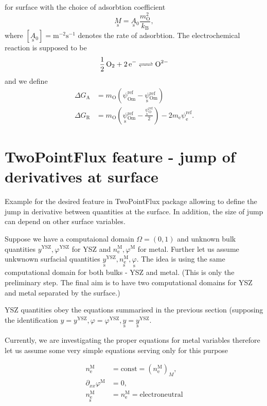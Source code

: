 \documentclass{article}
\numberwithin{equation}{section}
\newcommand{\us}[1]{\underset{\textrm{s}}{#1}{}}
\def\kB{k_\mathrm{B}}
\def\Ox{\mathrm{O}}
\def\DGA{\Delta G_\textrm{A}  }
\def\DGR{\Delta G_\textrm{R}  }
\def \YSZ{\textrm{YSZ}}
\def \M{\textrm{M}}
\def \yY{y^\YSZ}
\def \varphiY{\varphi^\YSZ}
\def \neM{n_\textrm{e}^\M}
\def \varphiM{\varphi^\M}
\def \yYs{{\us y}^\YSZ}
\def \neMs{\us \neM}
\begin{document}
for surface with the choice of adsorbtion coefficient
$$
\us M = \us A_0  \frac{m_\Ox^2}{\kB},
$$
where $[\us A_0] = \textrm{m}^{-2} \textrm{s}^{-1}$ denotes the rate of adsorbtion. The electrochemical reaction is supposed to be
\begin{align}
\ce{\frac{1}{2} \Ox_2 + 2\textrm{e}^- <=> \Ox^{2-}}
\end{align}
and we define
\begin{subequations}
\begin{align}
\DGA
&=
m_\Ox
\left(
	\psi_{\textrm{Om}}^\textrm{ref}
	-
	\us \psi_{\textrm{Om}}^\textrm{ref}
\right)
\\
\DGR
&= 
m_\Ox
\left(
	\us \psi_{\textrm{Om}}^\textrm{ref}
	-
	\frac{\us \psi_{\Ox}^\textrm{ref}}{2}
\right)
-
2 m_\textrm{e} \psi_{\textrm{e}}^\textrm{ref}.
\end{align}
\end{subequations}




\section{TwoPointFlux feature - jump of derivatives at surface}
Example for the desired feature in TwoPointFlux package allowing to define the jump in derivative between quantities at the surface. In addition, the size of jump can depend on other surface variables.

Suppose we have a computaional domain $\Omega = (0, 1)$ and unknown bulk quantities $\yY, \varphiY$ for YSZ and $\neM, \varphiM$ for metal. Further let us assume unkwnown surfacial quantities $\yYs, \neMs, \us \varphi$. The idea is using the same computational domain for both bulks - YSZ and metal. (This is only the preliminary step. The final aim is to have two computational domains for YSZ and metal separated by the surface.)

YSZ quantities obey the equations summarised in the previous section (supposing the identification $y = \yY, \varphi = \varphiY, \us y = \yYs$.

Currently, we are investigating the proper equations for metal variables therefore let us assume some very simple equations serving only for this purpose

\begin{subequations}
\begin{align}
\neM &= \textrm{const} = (\neM)_M,
\\
\partial_{xx} \varphiM &= 0,
\\
\neMs &= \neM = \textrm{electroneutral}
\end{align}
\end{subequations}
\end{document}
